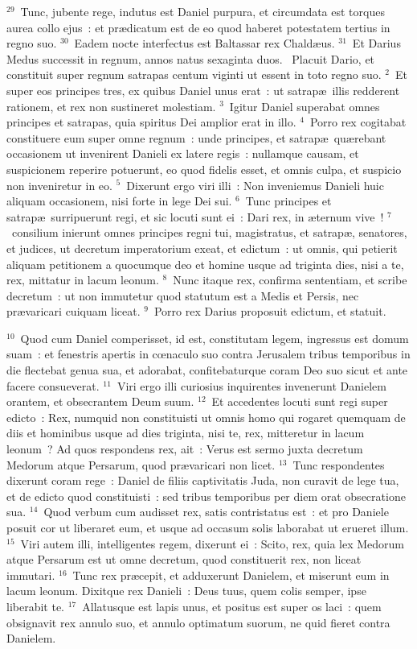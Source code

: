 ${}^{29}$~Tunc, jubente rege, indutus est Daniel purpura, et circumdata est torques aurea collo ejus~: et pr\ae dicatum est de eo quod haberet potestatem tertius in regno suo.
${}^{30}$~Eadem nocte interfectus est Baltassar rex Chald\ae us.
${}^{31}$~Et Darius Medus successit in regnum, annos natus sexaginta duos.
~\lettrine[lines=10,image=true,loversize=0.05,lraise=-0.03]{P}{}lacuit Dario, et constituit super regnum satrapas centum viginti ut essent in toto regno suo.
${}^{2}$~Et super eos principes tres, ex quibus Daniel unus erat~: ut satrap\ae\ illis redderent rationem, et rex non sustineret molestiam.
${}^{3}$~Igitur Daniel superabat omnes principes et satrapas, quia spiritus Dei amplior erat in illo.
${}^{4}$~Porro rex cogitabat constituere eum super omne regnum~: unde principes, et satrap\ae\ qu\ae rebant occasionem ut invenirent Danieli ex latere regis~: nullamque causam, et suspicionem reperire potuerunt, eo quod fidelis esset, et omnis culpa, et suspicio non inveniretur in eo.
${}^{5}$~Dixerunt ergo viri illi~: Non inveniemus Danieli huic aliquam occasionem, nisi forte in lege Dei sui.
${}^{6}$~Tunc principes et satrap\ae\ surripuerunt regi, et sic locuti sunt ei~: Dari rex, in \ae ternum vive~!
${}^{7}$~consilium inierunt omnes principes regni tui, magistratus, et satrap\ae , senatores, et judices, ut decretum imperatorium exeat, et edictum~: ut omnis, qui petierit aliquam petitionem a quocumque deo et homine usque ad triginta dies, nisi a te, rex, mittatur in lacum leonum.
${}^{8}$~Nunc itaque rex, confirma sententiam, et scribe decretum~: ut non immutetur quod statutum est a Medis et Persis, nec pr\ae varicari cuiquam liceat.
${}^{9}$~Porro rex Darius proposuit edictum, et statuit.


${}^{10}$~Quod cum Daniel comperisset, id est, constitutam legem, ingressus est domum suam~: et fenestris apertis in cœnaculo suo contra Jerusalem tribus temporibus in die flectebat genua sua, et adorabat, confitebaturque coram Deo suo sicut et ante facere consueverat.
${}^{11}$~Viri ergo illi curiosius inquirentes invenerunt Danielem orantem, et obsecrantem Deum suum.
${}^{12}$~Et accedentes locuti sunt regi super edicto~: Rex, numquid non constituisti ut omnis homo qui rogaret quemquam de diis et hominibus usque ad dies triginta, nisi te, rex, mitteretur in lacum leonum~? Ad quos respondens rex, ait~: Verus est sermo juxta decretum Medorum atque Persarum, quod pr\ae varicari non licet.
${}^{13}$~Tunc respondentes dixerunt coram rege~: Daniel de filiis captivitatis Juda, non curavit de lege tua, et de edicto quod constituisti~: sed tribus temporibus per diem orat obsecratione sua.
${}^{14}$~Quod verbum cum audisset rex, satis contristatus est~: et pro Daniele posuit cor ut liberaret eum, et usque ad occasum solis laborabat ut erueret illum.
${}^{15}$~Viri autem illi, intelligentes regem, dixerunt ei~: Scito, rex, quia lex Medorum atque Persarum est ut omne decretum, quod constituerit rex, non liceat immutari.
${}^{16}$~Tunc rex pr\ae cepit, et adduxerunt Danielem, et miserunt eum in lacum leonum. Dixitque rex Danieli~: Deus tuus, quem colis semper, ipse liberabit te.
${}^{17}$~Allatusque est lapis unus, et positus est super os laci~: quem obsignavit rex annulo suo, et annulo optimatum suorum, ne quid fieret contra Danielem.


